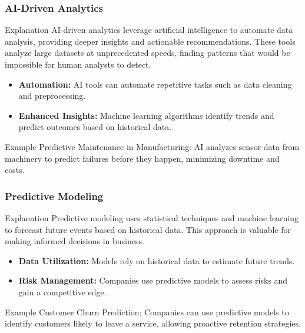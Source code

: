 \documentclass[aspectratio=169]{beamer}
\begin{document}
\begin{frame}[fragile]
    \frametitle{AI-Driven Analytics}
    
    \begin{block}{Explanation}
        AI-driven analytics leverage artificial intelligence to automate data analysis, providing deeper insights and actionable recommendations.
        These tools analyze large datasets at unprecedented speeds, finding patterns that would be impossible for human analysts to detect.
    \end{block}
    
    \begin{itemize}
        \item \textbf{Automation:} AI tools can automate repetitive tasks such as data cleaning and preprocessing.
        \item \textbf{Enhanced Insights:} Machine learning algorithms identify trends and predict outcomes based on historical data.
    \end{itemize}

    \begin{block}{Example}
        Predictive Maintenance in Manufacturing: AI analyzes sensor data from machinery to predict failures before they happen, minimizing downtime and costs.
    \end{block}
\end{frame}

\begin{frame}[fragile]
    \frametitle{Predictive Modeling}

    \begin{block}{Explanation}
        Predictive modeling uses statistical techniques and machine learning to forecast future events based on historical data.
        This approach is valuable for making informed decisions in business.
    \end{block}

    \begin{itemize}
        \item \textbf{Data Utilization:} Models rely on historical data to estimate future trends.
        \item \textbf{Risk Management:} Companies use predictive models to assess risks and gain a competitive edge.
    \end{itemize}

    \begin{block}{Example}
        Customer Churn Prediction: Companies can use predictive models to identify customers likely to leave a service, allowing proactive retention strategies.
    \end{block}
\end{frame}
\end{document}
